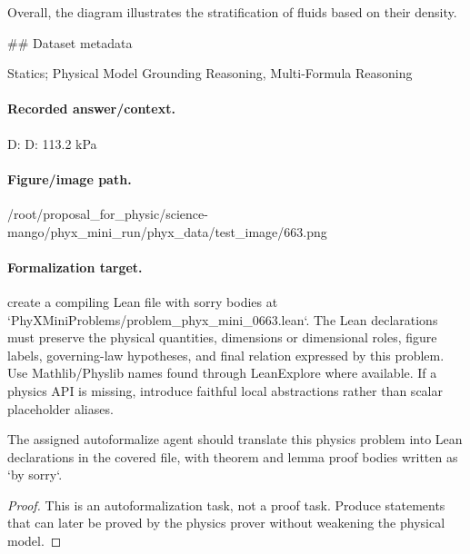 Overall, the diagram illustrates the stratification of fluids based on their density.

\#\# Dataset metadata

Statics; Physical Model Grounding Reasoning, Multi-Formula Reasoning

\paragraph{Recorded answer/context.}
D: D: 113.2 kPa

\paragraph{Figure/image path.}
/root/proposal\_for\_physic/science-mango/phyx\_mini\_run/phyx\_data/test\_image/663.png

\paragraph{Formalization target.}
create a compiling Lean file with sorry bodies at `PhyXMiniProblems/problem\_phyx\_mini\_0663.lean`. The Lean declarations must preserve the physical quantities, dimensions or dimensional roles, figure labels, governing-law hypotheses, and final relation expressed by this problem.
Use Mathlib/Physlib names found through LeanExplore where available. If a physics API is missing, introduce faithful local abstractions rather than scalar placeholder aliases.

\begin{theorem}
\label{thm:physics:phyx_mini_0663:target}
The assigned autoformalize agent should translate this physics problem into Lean declarations in the covered file, with theorem and lemma proof bodies written as `by sorry`.
\end{theorem}
\begin{proof}
This is an autoformalization task, not a proof task. Produce statements that can later be proved by the physics prover without weakening the physical model.
\end{proof}

